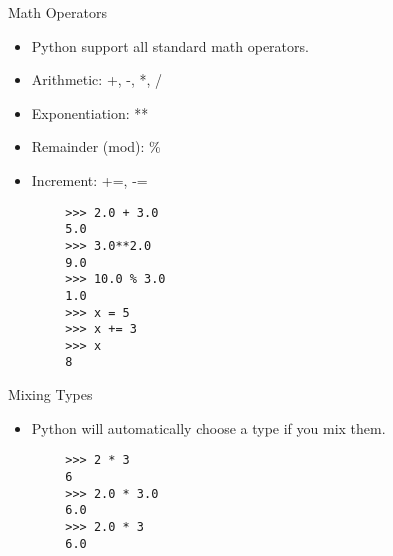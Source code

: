 \documentclass[serif,xcolor=pdftex,dvipsnames,table,hyperref={bookmarks=false,breaklinks}]{beamer}
\begin{document}
\begin{frame}[t,fragile]{Math Operators}
	\begin{itemize}[<+->]
		\item Python support all standard math operators.
		\item Arithmetic: +, -, *, /
		\item Exponentiation: **
		\item Remainder (mod): \%
		\item Increment: +=, -=
	\end{itemize}
	\pause
	\begin{tcolorbox}
		\begin{verbatim}
		>>> 2.0 + 3.0
		5.0
		>>> 3.0**2.0
		9.0
		>>> 10.0 % 3.0
		1.0
		>>> x = 5
		>>> x += 3
		>>> x
		8
	\end{verbatim}
	\end{tcolorbox}
\end{frame}

\begin{frame}[t,fragile]{Mixing Types}
	\begin{itemize}[<+->]
		\item Python will automatically choose a type if you mix them.
	\end{itemize}
	\pause
	\begin{tcolorbox}
		\begin{verbatim}
		>>> 2 * 3
		6
		>>> 2.0 * 3.0
		6.0
		>>> 2.0 * 3
		6.0
	\end{verbatim}
	\end{tcolorbox}
\end{frame}

%
\end{document}
